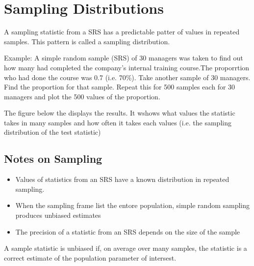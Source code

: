 \section*{Sampling Distributions}

A sampling statistic from a SRS has a predictable patter of values in repeated samples. This pattern is called a sampling distribution.


Example: A simple random sample (SRS) of 30 managers was taken to find out how many had completed the company's internal
training course.The proporrtion who had done the course was 0.7 (i.e. 70\%).
Take another sample of 30 managers. Find the proportion for that sample.
Repeat this for 500 samples each for 30 managers and plot the 500 values of the proportion.

The figure below the displays the results. It wshows what values the statistic takes in many samples and how
often it takes each values (i.e. the sampling distribution of the test statistic)



\subsection*{Notes on Sampling}

\begin{itemize}

\item Values of statistics from an SRS have a known distribution in repeated sampling.

\item When the sampling frame list the entore population, simple random sampling produces unbiased estimates

\item The precision of a statistic from an SRS depends on the size of the sample

\end{itemize}


A sample statistic is unbiased if, on average over many samples, the statistic is a correct estimate of the population parameter of intersest.

